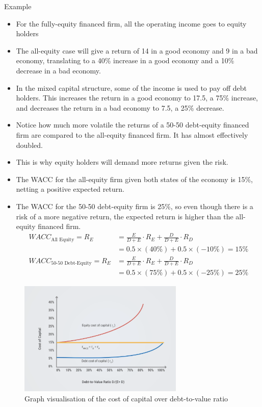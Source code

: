 \begin{examplebox}{Example}
\begin{itemize}
    \item For the fully-equity financed firm, all the operating income goes to equity holders
    \item The all-equity case will give a return of 14 in a good economy and 9 in a bad economy, translating to a 40\% increase in a good economy and a 10\% decrease in a bad economy.
    \item In the mixed capital structure, some of the income is used to pay off debt holders. This increases the return in a good economy to 17.5, a 75\% increase, and decreases the return in a bad economy to 7.5, a 25\% decrease.
    \item Notice how much more volatile the returns of a 50-50 debt-equity financed firm are compared to the all-equity financed firm. It has almost effectively doubled.
    \item This is why equity holders will demand more returns given the risk.
    \item The WACC for the all-equity firm given both states of the economy is 15\%, netting a positive expected return.
    \item The WACC for the 50-50 debt-equity firm is 25\%, so even though there is a risk of a more negative return, the expected return is higher than the all-equity financed firm.
    \begin{align}
        WACC_{\text{All Equity}} = R_E &= \frac{E}{D+E} \cdot R_E + \frac{D}{D+E} \cdot R_D \\
                                       &= 0.5 \times (40\%) + 0.5 \times (-10\%) = 15\%\\
        WACC_{\text{50-50 Debt-Equity}} = R_E &= \frac{E}{D+E} \cdot R_E + \frac{D}{D+E} \cdot R_D\\
                                        &= 0.5 \times (75\%) + 0.5 \times (-25\%) = 25\%
    \end{align}

\end{itemize}

\end{examplebox}

\begin{figure}[H]
    \centering
    \includegraphics[width=0.7\textwidth]{img/8.2.png}
    \caption{Graph visualisation of the cost of capital over debt-to-value ratio}
\end{figure}

